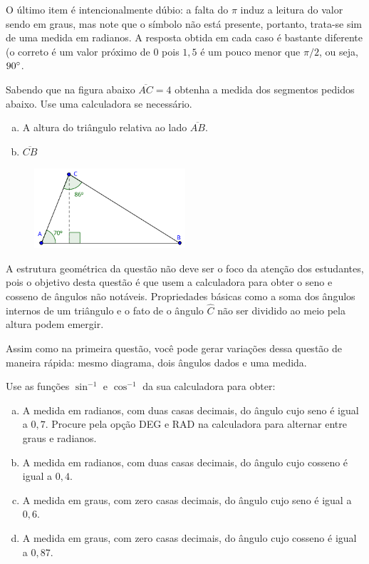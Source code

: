 \documentclass[main_estudante.tex]{subfiles}
\begin{document}
O último item é intencionalmente dúbio: a falta do $\pi$ induz a leitura do valor sendo em graus, mas note que o símbolo \degree não está presente, portanto, trata-se sim de uma medida em radianos. A resposta obtida em cada caso é bastante diferente (o correto é um valor próximo de 0 pois $1,5$ é um pouco menor que $\pi/2$, ou seja, $90\degree$.

\begin{questao}
Sabendo que na figura abaixo $\overline{AC}=4$ obtenha a medida dos segmentos pedidos abaixo. Use uma calculadora se necessário.
\begin{enumerate}[a)]
\item A altura do triângulo relativa ao lado $\overline{AB}$.
\item $\overline{CB}$
\end{enumerate}
\end{questao}

\begin{figure}[h]
\centering
\includegraphics[width=0.5\textwidth]{./img/c4q3.png}
\end{figure}

A estrutura geométrica da questão não deve ser o foco da atenção dos estudantes, pois o objetivo desta questão é que usem a calculadora para obter o seno e cosseno de ângulos não notáveis. Propriedades básicas como a soma dos ângulos internos de um triângulo e o fato de o ângulo $\hat{C}$ não ser dividido ao meio pela altura podem emergir.

Assim como na primeira questão, você pode gerar variações dessa questão de maneira rápida: mesmo diagrama, dois ângulos dados e uma medida. 

\begin{questao}
Use as funções $\sin^{-1}$ e $\cos^{-1}$ da sua calculadora para obter:
\begin{enumerate}[a)]
\item A medida em radianos, com duas casas decimais, do ângulo cujo seno é igual a $0,7$. Procure pela opção DEG e RAD na calculadora para alternar entre graus e radianos.
\item A medida em radianos, com duas casas decimais, do ângulo cujo cosseno é igual a $0,4$.
\item A medida em graus, com zero casas decimais, do ângulo cujo seno é igual a $0,6$. 
\item A medida em graus, com zero casas decimais, do ângulo cujo cosseno é igual a $0,87$.
\end{enumerate}
\end{questao}
\end{document}
